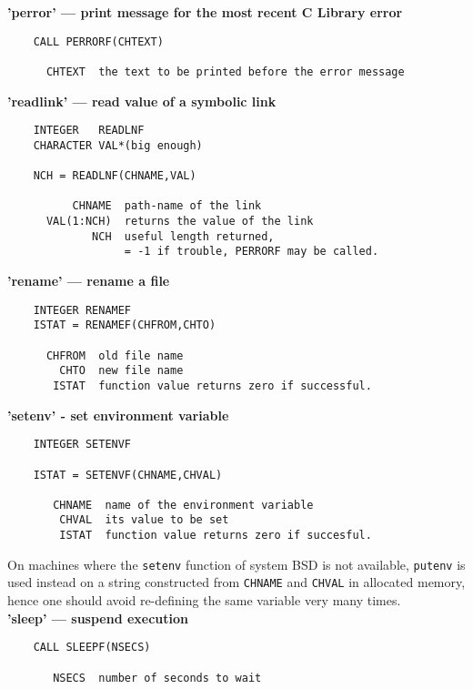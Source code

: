 \newpage
{\bf 'perror' --- print message for the most recent C Library error}
\begin{verbatim}
    CALL PERRORF(CHTEXT)
 
      CHTEXT  the text to be printed before the error message
\end{verbatim}
 
{\bf 'readlink' --- read value of a symbolic link}
\begin{verbatim}
    INTEGER   READLNF
    CHARACTER VAL*(big enough)
 
    NCH = READLNF(CHNAME,VAL)
 
          CHNAME  path-name of the link
      VAL(1:NCH)  returns the value of the link
             NCH  useful length returned,
                  = -1 if trouble, PERRORF may be called.
\end{verbatim}
 
{\bf 'rename' --- rename a file}
\begin{verbatim}
    INTEGER RENAMEF
    ISTAT = RENAMEF(CHFROM,CHTO)
 
      CHFROM  old file name
        CHTO  new file name
       ISTAT  function value returns zero if successful.
\end{verbatim}
 
{\bf 'setenv' - set environment variable}
\begin{verbatim}
    INTEGER SETENVF
 
    ISTAT = SETENVF(CHNAME,CHVAL)
 
       CHNAME  name of the environment variable
        CHVAL  its value to be set
        ISTAT  function value returns zero if succesful.
\end{verbatim}
On machines where the {\tt setenv} function of system BSD is not
available, {\tt putenv} is used instead on a string constructed from
{\tt CHNAME} and {\tt CHVAL} in allocated memory, hence one should
avoid re-defining the same variable very many times. \\
 
{\bf 'sleep' --- suspend execution}
\begin{verbatim}
    CALL SLEEPF(NSECS)
 
       NSECS  number of seconds to wait
\end{verbatim}
 
